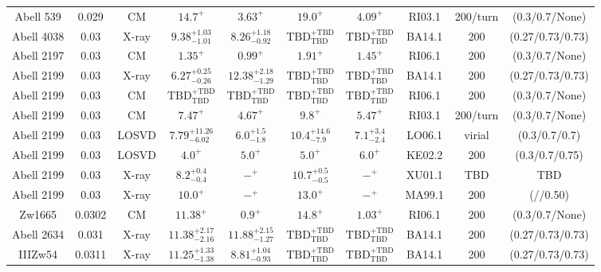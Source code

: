 \begin{table}
\begin{tabular}{cccccccccc}
Abell 539 & 0.029 & CM & ${14.7}^{+}_{}$ & ${3.63}^{+}_{}$ & ${19.0}^{+}_{}$ & ${4.09}^{+}_{}$ & RI03.1 & 200/turn & (0.3/0.7/None) \\
Abell 4038 & 0.03 & X-ray & ${9.38}^{+1.03}_{-1.01}$ & ${8.26}^{+1.18}_{-0.92}$ & ${\mathrm{TBD}}^{+\mathrm{TBD}}_{\mathrm{TBD}}$ & ${\mathrm{TBD}}^{+\mathrm{TBD}}_{\mathrm{TBD}}$ & BA14.1 & 200 & (0.27/0.73/0.73) \\
Abell 2197 & 0.03 & CM & ${1.35}^{+}_{}$ & ${0.99}^{+}_{}$ & ${1.91}^{+}_{}$ & ${1.45}^{+}_{}$ & RI06.1 & 200 & (0.3/0.7/None) \\
Abell 2199 & 0.03 & X-ray & ${6.27}^{+0.25}_{-0.26}$ & ${12.38}^{+2.18}_{-1.29}$ & ${\mathrm{TBD}}^{+\mathrm{TBD}}_{\mathrm{TBD}}$ & ${\mathrm{TBD}}^{+\mathrm{TBD}}_{\mathrm{TBD}}$ & BA14.1 & 200 & (0.27/0.73/0.73) \\
Abell 2199 & 0.03 & CM & ${\mathrm{TBD}}^{+\mathrm{TBD}}_{\mathrm{TBD}}$ & ${\mathrm{TBD}}^{+\mathrm{TBD}}_{\mathrm{TBD}}$ & ${\mathrm{TBD}}^{+\mathrm{TBD}}_{\mathrm{TBD}}$ & ${\mathrm{TBD}}^{+\mathrm{TBD}}_{\mathrm{TBD}}$ & RI06.1 & 200 & (0.3/0.7/None) \\
Abell 2199 & 0.03 & CM & ${7.47}^{+}_{}$ & ${4.67}^{+}_{}$ & ${9.8}^{+}_{}$ & ${5.47}^{+}_{}$ & RI03.1 & 200/turn & (0.3/0.7/None) \\
Abell 2199 & 0.03 & LOSVD & ${7.79}^{+11.26}_{-6.02}$ & ${6.0}^{+1.5}_{-1.8}$ & ${10.4}^{+14.6}_{-7.9}$ & ${7.1}^{+3.4}_{-2.4}$ & LO06.1 & virial & (0.3/0.7/0.7) \\
Abell 2199 & 0.03 & LOSVD & ${4.0}^{+}_{}$ & ${5.0}^{+}_{}$ & ${5.0}^{+}_{}$ & ${6.0}^{+}_{}$ & KE02.2 & 200 & (0.3/0.7/0.75) \\
Abell 2199 & 0.03 & X-ray & ${8.2}^{+0.4}_{-0.4}$ & ${-}^{+}_{}$ & ${10.7}^{+0.5}_{-0.5}$ & ${-}^{+}_{}$ & XU01.1 & TBD & TBD \\
Abell 2199 & 0.03 & X-ray & ${10.0}^{+}_{}$ & ${-}^{+}_{}$ & ${13.0}^{+}_{}$ & ${-}^{+}_{}$ & MA99.1 & 200 & (//0.50) \\
Zw1665 & 0.0302 & CM & ${11.38}^{+}_{}$ & ${0.9}^{+}_{}$ & ${14.8}^{+}_{}$ & ${1.03}^{+}_{}$ & RI06.1 & 200 & (0.3/0.7/None) \\
Abell 2634 & 0.031 & X-ray & ${11.38}^{+2.17}_{-2.16}$ & ${11.88}^{+2.15}_{-1.27}$ & ${\mathrm{TBD}}^{+\mathrm{TBD}}_{\mathrm{TBD}}$ & ${\mathrm{TBD}}^{+\mathrm{TBD}}_{\mathrm{TBD}}$ & BA14.1 & 200 & (0.27/0.73/0.73) \\
IIIZw54 & 0.0311 & X-ray & ${11.25}^{+1.33}_{-1.38}$ & ${8.81}^{+1.04}_{-0.93}$ & ${\mathrm{TBD}}^{+\mathrm{TBD}}_{\mathrm{TBD}}$ & ${\mathrm{TBD}}^{+\mathrm{TBD}}_{\mathrm{TBD}}$ & BA14.1 & 200 & (0.27/0.73/0.73) \\

\end{tabular}
\end{table}
